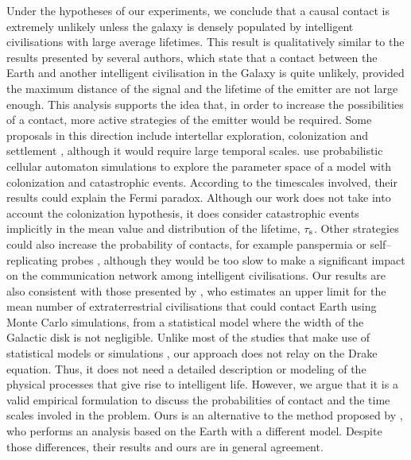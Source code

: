 \documentclass[crop]{CSLB}
\begin{document}
Under the hypotheses of our experiments, we conclude that a causal
contact is extremely unlikely unless the galaxy is densely populated
by intelligent civilisations with large average lifetimes.
%
This result is qualitatively similar to the results presented by
several authors, which state that a contact between the Earth and
another intelligent civilisation in the Galaxy is quite unlikely,
provided the maximum distance of the signal and the lifetime of the
emitter are not large enough.
%
This analysis supports the idea that, in order to increase the
possibilities of a contact, more active strategies of the emitter
would be required.
%
Some proposals in this direction include intertellar exploration,
colonization and settlement \citep{brin_great_1983, Dosovic2019,
galera_invasion_2019}, although it would require large temporal
scales.
%
\citet{Dosovic2019} use probabilistic cellular automaton simulations
to explore the parameter space of a model with colonization and
catastrophic events.
%
According to the timescales involved, their results could explain the
Fermi paradox.
%
Although our work does not take into account the colonization
hypothesis, it does consider catastrophic events implicitly in the
mean value and distribution of the lifetime, $\tau_{\rm s}$.
%
Other strategies could also increase the probability of contacts, for
example panspermia \citep[e.g.,][]{starling_virulence_2013} or
self--replicating probes \citep[e.g.,][]{barlow_galactic_2013},
although they would be too slow to make a significant impact on the
communication network among intelligent civilisations.
%
Our results are also consistent with those presented by
\citet{grimaldi_signal_2017}, who estimates an upper limit for the
mean number of extraterrestrial civilisations that could contact Earth
using Monte Carlo simulations, from a statistical model where the
width of the Galactic disk is not negligible.
%
Unlike most of the studies that make use of statistical models or
simulations \citep{cirkovic_temporal_2004, smith_broadcasting_2009,
bloetscher_using_2019}, our approach does not relay on the Drake
equation.
%
Thus, it does not need a detailed description or modeling of the
physical processes that give rise to intelligent life.
%
However, we argue that it is a valid empirical formulation to discuss
the probabilities of contact and the time scales involed in the
problem.
%
Ours is an alternative to the method proposed by
\citet{balbi_impact_2018}, who performs an analysis based on the Earth
with a different model.
%
Despite those differences, their results and ours are in general
agreement.
\end{document}
